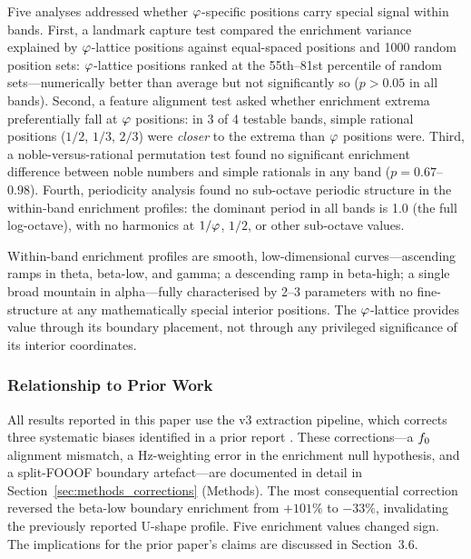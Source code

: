 Five analyses addressed whether $\varphi$-specific positions carry special signal within bands. First, a landmark capture test compared the enrichment variance explained by $\varphi$-lattice positions against equal-spaced positions and 1000 random position sets: $\varphi$-lattice positions ranked at the 55th--81st percentile of random sets---numerically better than average but not significantly so ($p > 0.05$ in all bands). Second, a feature alignment test asked whether enrichment extrema preferentially fall at $\varphi$ positions: in 3 of 4 testable bands, simple rational positions ($1/2$, $1/3$, $2/3$) were \emph{closer} to the extrema than $\varphi$ positions were. Third, a noble-versus-rational permutation test found no significant enrichment difference between noble numbers and simple rationals in any band ($p = 0.67$--$0.98$). Fourth, periodicity analysis found no sub-octave periodic structure in the within-band enrichment profiles: the dominant period in all bands is 1.0 (the full log-octave), with no harmonics at $1/\varphi$, $1/2$, or other sub-octave values.

Within-band enrichment profiles are smooth, low-dimensional curves---ascending ramps in theta, beta-low, and gamma; a descending ramp in beta-high; a single broad mountain in alpha---fully characterised by 2--3 parameters with no fine-structure at any mathematically special interior positions. The $\varphi$-lattice provides value through its boundary placement, not through any privileged significance of its interior coordinates.

\subsubsection{Relationship to Prior Work}

All results reported in this paper use the v3 extraction pipeline, which corrects three systematic biases identified in a prior report \parencite{lacy2026frontiers}. These corrections---a $f_0$ alignment mismatch, a Hz-weighting error in the enrichment null hypothesis, and a split-FOOOF boundary artefact---are documented in detail in Section~\ref{sec:methods_corrections} (Methods). The most consequential correction reversed the beta-low boundary enrichment from $+101\%$ to $-33\%$, invalidating the previously reported U-shape profile. Five enrichment values changed sign. The implications for the prior paper's claims are discussed in Section~3.6.
